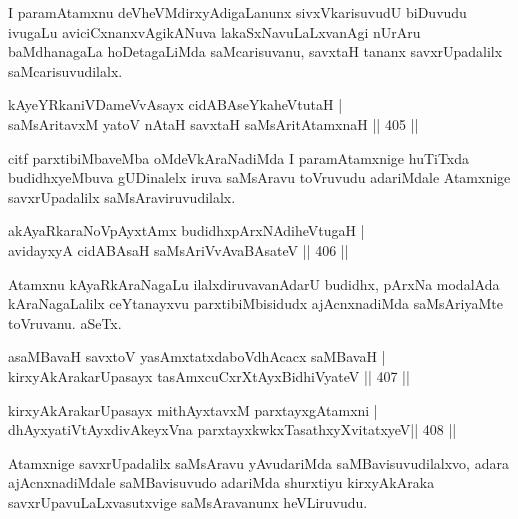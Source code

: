 \begin{artha}
I paramAtamxnu deVheVMdirxyAdigaLanunx sivxVkarisuvudU biDuvudu ivugaLu aviciCxnanxvAgikANuva lakaSxNavuLaLxvanAgi nUrAru baMdhanagaLa hoDetagaLiMda saMcarisuvanu, savxtaH tananx savxrUpadalilx saMcarisuvudilalx.
\end{artha}


\begin{shl}
kAyeYRkaniVDameVvAsayx cidABAseYkaheVtutaH | \\
saMsAritavxM yatoV nAtaH savxtaH saMsAritA\s \s tamxnaH \hfill||  405 || 
\end{shl}

\begin{artha}
citf parxtibiMbaveMba oMdeVkAraNadiMda I paramAtamxnige huTiTxda budidhxyeMbuva gUDinalelx iruva saMsAravu toVruvudu adariMdale Atamxnige savxrUpadalilx saMsAraviruvudilalx.
\end{artha}


\begin{shl}
akAyaRkaraNoV\s pAyxtAmx budidhxpArxNAdiheVtugaH | \\
avidayxyA cidABAsaH saMsAriVvAvaBAsateV \hfill||  406 || 
\end{shl}

\begin{artha}
Atamxnu kAyaRkAraNagaLu ilalxdiruvavanAdarU budidhx, pArxNa modalAda kAraNagaLalilx ceYtanayxvu parxtibiMbisidudx ajAcnxnadiMda saMsAriyaMte toVruvanu. aSeTx.
\end{artha}


\begin{shl}
asaMBavaH savxtoV yasAmxtatxdaboVdhAcacx saMBavaH | \\
kirxyAkArakarUpasayx tasAmxcuCxrXtAyx\s BidhiVyateV \hfill||  407 || 
\end{shl}
				
\begin{shl}
kirxyAkArakarUpasayx mithAyxtavxM parxtayxgAtamxni | \\
dhAyxyatiVtAyxdivAkeyxVna parxtayxkwkxTasathxyXvitatxyeV\hfill||  408 ||  
\end{shl}

\begin{artha}
Atamxnige savxrUpadalilx saMsAravu yAvudariMda saMBavisuvudilalxvo, adara ajAcnxnadiMdale saMBavisuvudo adariMda shurxtiyu kirxyAkAraka savxrUpavuLaLxvasutxvige saMsAravanunx heVLiruvudu.
\end{artha}

